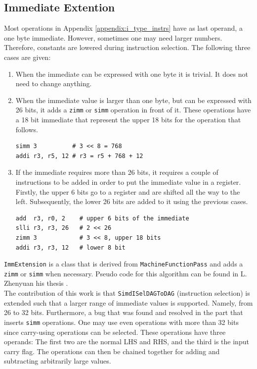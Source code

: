 \subsection{Immediate Extention}\label{sec:immediate_ext}
Most operations in Appendix \ref{appendix:i_type_instrs} have as last operand, a one byte immediate. However, sometimes one may need larger numbers. Therefore, constants are lowered during instruction selection. The following three cases are given:
\begin{enumerate}
\item When the immediate can be expressed with one byte it is trivial. It does not need to change anything.
\item When the immediate value is larger than one byte, but can be expressed with 26 bits, it adds a \texttt{zimm} or \texttt{simm} operation in front of it. These operations have a 18 bit immediate that represent the upper 18 bits for the operation that follows.

\begin{lstlisting}
simm 3          # 3 << 8 = 768
addi r3, r5, 12 # r3 = r5 + 768 + 12
\end{lstlisting}
\item If the immediate requires more than 26 bits, it requires a couple of instructions to be added in order to put the immediate value in a register. Firstly, the upper 6 bits go to a register and are shifted all the way to the left. Subsequently, the lower 26 bits are added to it using the previous cases.
\begin{lstlisting}
add  r3, r0, 2    # upper 6 bits of the immediate
slli r3, r3, 26   # 2 << 26
zimm 3            # 3 << 8, upper 18 bits
addi r3, r3, 12   # lower 8 bit
\end{lstlisting}
\end{enumerate}

\texttt{ImmExtension} is a class that is derived from \texttt{MachineFunctionPass} and adds a \texttt{zimm} or \texttt{simm} when necessary. Pseudo code for this algorithm can be found in L. Zhenyuan his thesis \cite[Appendix B]{liu_zhenyuan}. \\

The contribution of this work is that \texttt{SimdISelDAGToDAG} (instruction selection) is extended such that a larger range of immediate values is supported. Namely, from 26 to 32 bits. Furthermore, a bug that was found and resolved in the part that inserts \texttt{simm} operations. One may use even operations with more than 32 bits since carry-using operations can be selected. These operations have three operands: The first two are the normal LHS and RHS, and the third is the input carry flag. The operations can then be chained together for adding and subtracting arbitrarily large values.

